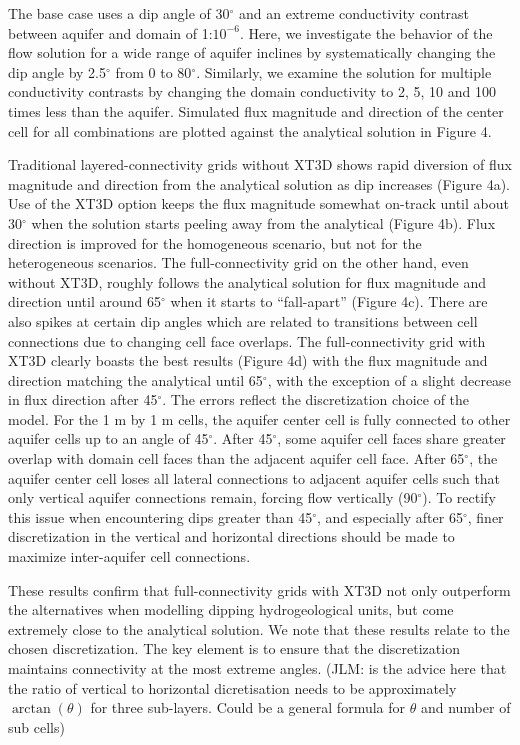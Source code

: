 \documentclass{article}
\begin{document}
The base case uses a dip angle of 30$^{\circ}$ and an extreme conductivity contrast between aquifer and domain of 1:$10^{-6}$. Here, we investigate the behavior of the flow solution for a wide range of aquifer inclines by systematically changing the dip angle by 2.5$^{\circ}$ from 0 to 80$^{\circ}$. Similarly, we examine the solution for multiple conductivity contrasts by changing the domain conductivity to 2, 5, 10 and 100 times less than the aquifer.  Simulated flux magnitude and direction of the center cell for all combinations are plotted against the analytical solution in Figure 4. 

Traditional layered-connectivity grids without XT3D shows rapid diversion of flux magnitude and direction from the analytical solution as dip increases (Figure 4a). Use of the XT3D option keeps the flux magnitude somewhat on-track until about 30$^{\circ}$ when the solution starts peeling away from the analytical (Figure 4b). Flux direction is improved for the homogeneous scenario, but not for the heterogeneous scenarios. The full-connectivity grid on the other hand, even without XT3D, roughly follows the analytical solution for flux magnitude and direction until around 65$^{\circ}$ when it starts to ``fall-apart'' (Figure 4c). There are also spikes at certain dip angles which are related to transitions between cell connections due to changing cell face overlaps. The full-connectivity grid with XT3D clearly boasts the best results (Figure 4d) with the flux magnitude and direction matching the analytical until 65$^{\circ}$, with the exception of a slight decrease in flux direction after 45$^{\circ}$. The errors reflect the discretization choice of the model. For the 1 m by 1 m cells, the aquifer center cell is fully connected to other aquifer cells up to an angle of 45$^{\circ}$. After 45$^{\circ}$, some aquifer cell faces share greater overlap with domain cell faces than the adjacent aquifer cell face. After 65$^{\circ}$, the aquifer center cell loses all lateral connections to adjacent aquifer cells such that only vertical aquifer connections remain, forcing flow vertically (90$^{\circ}$). To rectify this issue when encountering dips greater than 45$^{\circ}$, and especially after 65$^{\circ}$, finer discretization in the vertical and horizontal directions should be made to maximize inter-aquifer cell connections.  

These results confirm that full-connectivity grids with XT3D not only outperform the alternatives when modelling dipping hydrogeological units, but come extremely close to the analytical solution. We note that these results relate to the chosen discretization. The key element is to ensure that the discretization maintains connectivity at the most extreme angles. {\color{red} (JLM: is the advice here that the ratio of vertical to horizontal dicretisation needs to be approximately $\arctan(\theta)$ for three sub-layers. Could be a general formula for $\theta$ and number of sub cells)}
\end{document}
